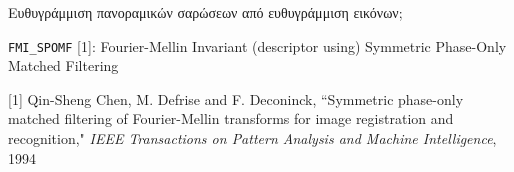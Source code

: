 \begin{frame}{Ευθυγράμμιση πανοραμικών σαρώσεων από ευθυγράμμιση εικόνων;}

  {\small
  \texttt{FMI\_SPOMF} [1]: Fourier-Mellin Invariant (descriptor using) Symmetric Phase-Only Matched Filtering
  }

  \begin{figure}
    
  \end{figure}

  \placebottom
  \tiny
  [1] Qin-Sheng Chen, M. Defrise and F. Deconinck, ``Symmetric phase-only matched filtering of Fourier-Mellin transforms for image registration and recognition," \textit{IEEE Transactions on Pattern Analysis and Machine Intelligence}, 1994


\end{frame}
